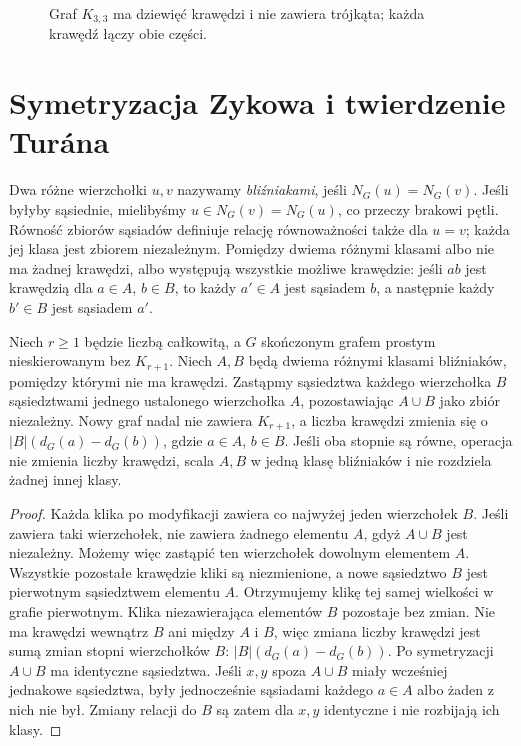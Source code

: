 \begin{figure}[htbp]
\centering
{}
\caption{Graf $K_{3,3}$ ma dziewięć krawędzi
i nie zawiera trójkąta; każda krawędź łączy obie części.}
\label{fig:tg-mantel-graph}
\end{figure}

\section{Symetryzacja Zykowa i twierdzenie Turána}
\label{sec:tg-extremal-turan}

Dwa różne wierzchołki $u,v$ nazywamy
\emph{bliźniakami}, jeśli $N_G(u)=N_G(v)$.
Jeśli byłyby sąsiednie, mielibyśmy $u\in N_G(v)=N_G(u)$,
co przeczy brakowi pętli. Równość zbiorów sąsiadów
definiuje relację równoważności także dla $u=v$;
każda jej klasa jest zbiorem niezależnym.
Pomiędzy dwiema różnymi klasami albo nie ma żadnej
krawędzi, albo występują wszystkie możliwe krawędzie:
jeśli $ab$ jest krawędzią dla $a\in A$, $b\in B$,
to każdy $a'\in A$ jest sąsiadem $b$, a następnie
każdy $b'\in B$ jest sąsiadem $a'$.

\begin{lemat}
\label{lem:tg-zykov}
Niech $r\geq1$ będzie liczbą całkowitą, a $G$
skończonym grafem prostym nieskierowanym bez $K_{r+1}$.
Niech $A,B$ będą dwiema różnymi klasami bliźniaków,
pomiędzy którymi nie ma krawędzi.
Zastąpmy sąsiedztwa każdego wierzchołka $B$
sąsiedztwami jednego ustalonego wierzchołka $A$,
pozostawiając $A\cup B$ jako zbiór niezależny.
Nowy graf nadal nie zawiera $K_{r+1}$,
a liczba krawędzi zmienia się o
$|B|(d_G(a)-d_G(b))$, gdzie $a\in A$, $b\in B$.
Jeśli oba stopnie są równe, operacja nie zmienia
liczby krawędzi, scala $A,B$ w jedną klasę
bliźniaków i nie rozdziela żadnej innej klasy.
\end{lemat}
\begin{proof}
Każda klika po modyfikacji zawiera
co najwyżej jeden wierzchołek $B$.
Jeśli zawiera taki wierzchołek, nie zawiera
żadnego elementu $A$, gdyż $A\cup B$ jest niezależny.
Możemy więc zastąpić ten wierzchołek dowolnym
elementem $A$. Wszystkie pozostałe krawędzie
kliki są niezmienione, a nowe sąsiedztwo $B$
jest pierwotnym sąsiedztwem elementu $A$.
Otrzymujemy klikę tej samej wielkości w grafie
pierwotnym. Klika niezawierająca elementów $B$
pozostaje bez zmian.
Nie ma krawędzi wewnątrz $B$ ani między
$A$ i $B$, więc zmiana liczby krawędzi
jest sumą zmian stopni wierzchołków $B$:
$|B|(d_G(a)-d_G(b))$.
Po symetryzacji $A\cup B$ ma identyczne
sąsiedztwa. Jeśli $x,y$ spoza $A\cup B$
miały wcześniej jednakowe sąsiedztwa,
były jednocześnie sąsiadami każdego
$a\in A$ albo żaden z nich nie był.
Zmiany relacji do $B$ są zatem dla $x,y$
identyczne i nie rozbijają ich klasy.
\end{proof}

